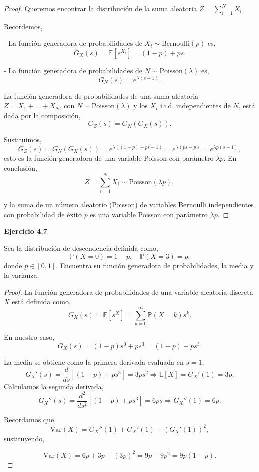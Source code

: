 \documentclass{article}
\begin{document}
\begin{proof}
Queremos encontrar la distribución de la suma aleatoria $Z = \sum_{i=1}^{N} X_i$.

Recordemos,

- La función generadora de probabilidades de $X_i \sim \text{Bernoulli}(p)$ es,
\[
G_{X}(s) = \mathbb{E}[s^{X_i}] = (1 - p) + ps.
\]

- La función generadora de probabilidades de $N \sim \text{Poisson}(\lambda)$ es,
\[
G_N(s) = e^{\lambda(s - 1)}.
\]

La función generadora de probabilidades de una suma aleatoria \( Z = X_1 + \dots + X_N \), con \( N \sim \text{Poisson}(\lambda) \) y los \( X_i \) i.i.d. independientes de \( N \), está dada por la composición,
\[
G_Z(s) = G_N(G_X(s)).
\]

Sustituimos,
\[
G_Z(s) = G_N(G_X(s)) = e^{\lambda \left( (1 - p) + ps - 1 \right)} = e^{\lambda (ps - p)} = e^{\lambda p (s - 1)},
\]
esto es la función generadora de una variable Poisson con parámetro $\lambda p$.
En conclusión,
\[
Z = \sum_{i=1}^N X_i \sim \text{Poisson}(\lambda p),
\]

y la suma de un número aleatorio (Poisson) de variables Bernoulli independientes con probabilidad de éxito $p$ es una variable Poisson con parámetro $\lambda p$.
\end{proof}

\textbf{Ejercicio 4.7}

Sea la distribución de descendencia definida como,
\[
\mathbb{P}(X = 0) = 1 - p, \quad \mathbb{P}(X = 3) = p.
\]
donde \( p \in [0,1] \). Encuentra su función generadora de probabilidades, la media y la varianza.

\begin{proof}
La función generadora de probabilidades de una variable aleatoria discreta \( X \) está definida como,
\[
G_X(s) = \mathbb{E}[s^X] = \sum_{k=0}^{\infty} \mathbb{P}(X = k) s^k.
\]

En nuestro caso,
\[
G_X(s) = (1 - p) s^0 + p s^3 = (1 - p) + p s^3.
\]

La media se obtiene como la primera derivada evaluada en \( s = 1 \),
\[
G_X'(s) = \frac{d}{ds}[(1 - p) + p s^3] = 3p s^2 \Rightarrow \mathbb{E}[X] = G_X'(1) = 3p.
\]
Calculamos la segunda derivada,
\[
G_X''(s) = \frac{d^2}{ds^2}[(1 - p) + p s^3] = 6p s \Rightarrow G_X''(1) = 6p.
\]

Recordamos que,
\[
\text{Var}(X) = G_X''(1) + G_X'(1) - (G_X'(1))^2,
\]
sustituyendo,

\[
\text{Var}(X) = 6p + 3p - (3p)^2 = 9p - 9p^2 = 9p(1 - p).
\]
\end{proof}
\end{document}
